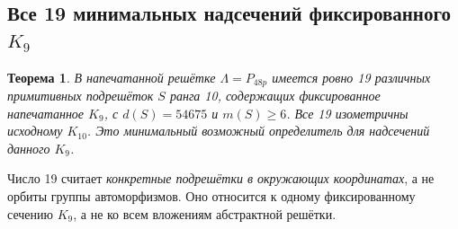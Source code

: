 \documentclass[11pt,a4paper]{article}
\newtheorem{theorem}{Теорема}[section]
\theoremstyle{remark}\newtheorem{remark}[theorem]{Замечание}
\begin{document}
\subsection{Все 19 минимальных надсечений фиксированного \texorpdfstring{$K_9$}{K9}}

\begin{theorem}\label{thm:nineteen}
В напечатанной решётке $\Lambda=P_{48p}$ имеется ровно 19 различных примитивных подрешёток $S$ ранга 10, содержащих фиксированное напечатанное $K_9$, с $d(S)=54675$ и $m(S)\ge6$. Все 19 изометричны исходному $K_{10}$. Это минимальный возможный определитель для надсечений данного $K_9$.
\end{theorem}

Число 19 считает \emph{конкретные подрешётки в окружающих координатах}, а не орбиты группы автоморфизмов. Оно относится к одному фиксированному сечению $K_9$, а не ко всем вложениям абстрактной решётки.
\end{document}
